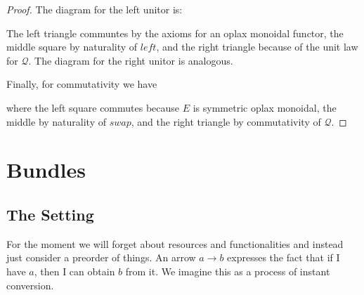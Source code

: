 \documentclass[12pt]{article}
\theoremstyle{definition}
\theoremstyle{plain}
\theoremstyle{plain}
\theoremstyle{plain}
\theoremstyle{plain}
\theoremstyle{remark}
\theoremstyle{remark}
\newcommand{\mc}[1]{\mathcal{#1}}
\begin{document}
\begin{proof}
	The diagram for the left unitor is:
	\begin{center}
	\end{center}
	The left triangle communtes by the axioms for an oplax monoidal functor, the middle square by naturality of $\mathit{left}$, and the right triangle because of the unit law for $\mc{Q}$. The diagram for the right unitor is analogous.
	
	Finally, for commutativity we have
	\begin{center}
	\end{center}
	where the left square commutes because $E$ is symmetric oplax monoidal, the middle by naturality of $\mathit{swap}$, and the right triangle by commutativity of $\mc{Q}$.
\end{proof}


\section{Bundles}

\subsection{The Setting}

For the moment we will forget about resources and functionalities and instead just consider a preorder of things. An arrow $a \rightarrow b$ expresses the fact that if I have $a$, then I can obtain $b$ from it. We imagine this as a process of instant conversion. 
\end{document}
